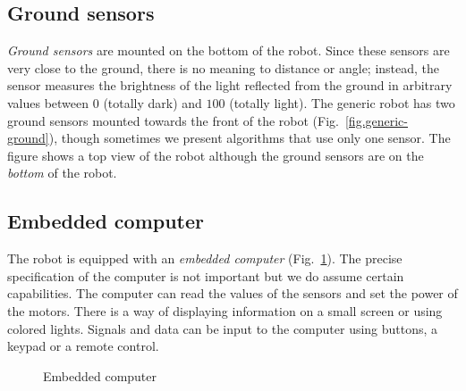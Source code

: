 \subsection{Ground sensors}

\emph{Ground sensors} are mounted on the bottom of the robot. Since these sensors are very close to the ground, there is no meaning to distance or angle; instead, the sensor measures the brightness of the light reflected from the ground in arbitrary values between $0$ (totally dark) and $100$ (totally light). The generic robot has two ground sensors mounted towards the front of the robot (Fig.~\ref{fig.generic-ground}), though sometimes we present algorithms that use only one sensor. The figure shows a top view of the robot although the ground sensors are on the \emph{bottom} of the robot.

\subsection{Embedded computer}\label{s.embedded}

The robot is equipped with an \emph{embedded computer} (Fig.~\ref{fig.computer}). The precise specification of the computer is not important but we do assume certain capabilities. The computer can read the values of the sensors and set the power of the motors. There is a way of displaying information on a small screen or using colored lights. Signals and data can be input to the computer using buttons, a keypad or a remote control.

\begin{figure}
\begin{center}
\caption{Embedded computer}\label{fig.computer}
\end{center}
\end{figure}

